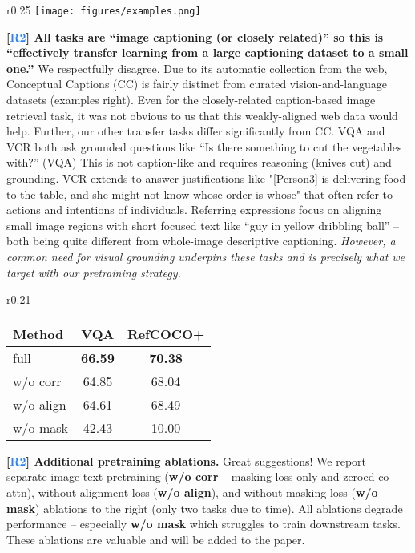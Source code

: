 \documentclass{article}
\newcommand{\xhdr}[1]{\vspace{0pt}\noindent\textbf{#1}}
\newcommand{\two}{\textbf{\textcolor[HTML]{2980f9}{R2}}}
\renewcommand{\xhdr}[1]{\noindent \textbf{#1}}
\begin{document}
\begin{wrapfigure}{r}{0.25\textwidth}
\vspace{-14pt}
\texttt{[image: figures/examples.png]} 
\vspace{-20pt}
\end{wrapfigure}\xhdr{[\two] All tasks are ``image captioning (or closely related)'' so this is ``effectively transfer learning from a large captioning dataset to a small one.''}
We respectfully disagree.
Due to its automatic collection from the web, Conceptual Captions (CC) is fairly distinct from curated vision-and-language datasets (examples right).
Even for the closely-related caption-based image retrieval task, it was not obvious to us that this weakly-aligned web data would help. Further, our other transfer tasks differ significantly from CC. 
VQA and VCR both ask grounded questions like ``Is there something to cut the vegetables with?'' (VQA) This is not caption-like and requires reasoning (knives cut) and grounding. VCR extends to answer justifications like "[Person3] is delivering food to the table, and she might not know whose order is whose" that often refer to actions and intentions of individuals.
Referring expressions focus on aligning small image regions with short focused text like ``guy in yellow dribbling ball'' -- both being quite different from whole-image descriptive captioning. \emph{However, a common need for visual grounding underpins these tasks and is precisely what we target with our pretraining strategy.}

\setlength{\tabcolsep}{4pt}
\begin{wraptable}{r}{0.21\textwidth}
\vspace{-14pt}
\footnotesize
\addtolength{\tabcolsep}{-2pt}
\begin{tabular}{l c c}
\toprule
\scriptsize Method & \scriptsize VQA & \scriptsize RefCOCO+ \\
\midrule
full & \textbf{66.59} & \textbf{70.38}\\
w/o corr & 64.85 & 68.04 \\
w/o align & 64.61 & 68.49 \\
w/o mask & 42.43 & 10.00 \\
\bottomrule
\end{tabular}
\vspace{-15pt}
\end{wraptable}
\xhdr{[\two] Additional pretraining ablations.} Great suggestions! We report separate image-text pretraining (\textbf{w/o corr} -- masking loss only and zeroed co-attn), without alignment loss (\textbf{w/o align}), and without masking loss (\textbf{w/o mask}) ablations to the right (only two tasks due to time). All ablations degrade performance -- especially \textbf{w/o mask} which struggles to train downstream tasks. These ablations are valuable and will be added to the paper.
\end{document}
